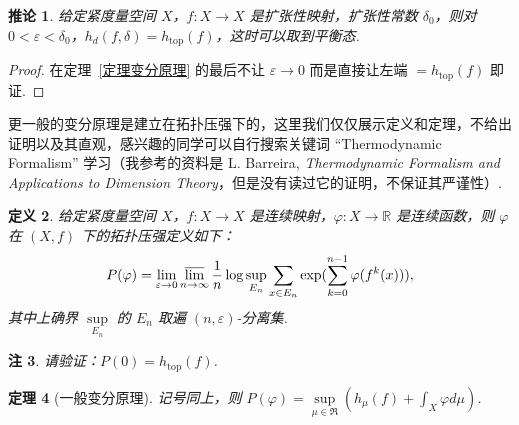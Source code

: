\documentclass[11pt, a4paper, oneside]{ctexart}
\newtheorem{theorem}{定理}[section]
\newtheorem{corollary}[theorem]{推论}
\newtheorem{definition}[theorem]{定义}
\newtheorem{remark}[theorem]{注}
\newcommand{\R}{\mathbb{R}}
\newcommand{\fR}{\mathfrak{R}}
\renewcommand{\top}{\mathrm{top}}
\begin{document}
    \begin{corollary}
        给定紧度量空间 $X$，$f:X\to X$ 是扩张性映射，扩张性常数 $\delta_0$，则对 $0<\varepsilon<\delta_0$，$h_d(f,\delta)=h_{\top}(f)$，这时可以取到平衡态.
    \end{corollary}
    \begin{proof}
        在定理~\ref{定理变分原理} 的最后不让 $\varepsilon\to 0$ 而是直接让左端 $=h_{\top}(f)$ 即证.
    \end{proof}

    更一般的变分原理是建立在拓扑压强下的，这里我们仅仅展示定义和定理，不给出证明以及其直观，感兴趣的同学可以自行搜索关键词 ``Thermodynamic Formalism'' 学习（我参考的资料是 L. Barreira, \emph{Thermodynamic Formalism and Applications to Dimension Theory}，但是没有读过它的证明，不保证其严谨性）.

    \begin{definition}
        给定紧度量空间 $X$，$f:X\to X$ 是连续映射，$\varphi:X\to \R$ 是连续函数，则 $\varphi$ 在 $(X,f)$ 下的拓扑压强定义如下：
        \[
        P(\varphi)=\lim\limits_{\varepsilon\to 0}\varlimsup\limits_{n\to\infty}\frac{1}{n}\log\sup\limits_{E_n}\sum\limits_{x\in E_n}\exp(\sum\limits_{k=0}^{n-1}\varphi(f^k(x))),
        \]
        其中上确界 $\sup\limits_{E_n}$ 的 $E_n$ 取遍 $(n,\varepsilon)$-分离集.
    \end{definition}
    \begin{remark}
        请验证：$P(0)=h_{\top}(f)$.
    \end{remark}
    \begin{theorem}[一般变分原理]
        记号同上，则 $P(\varphi)=\sup\limits_{\mu\in\fR}(h_{\mu}(f)+\int_{X}\varphi d\mu)$.
    \end{theorem}
\end{document}
